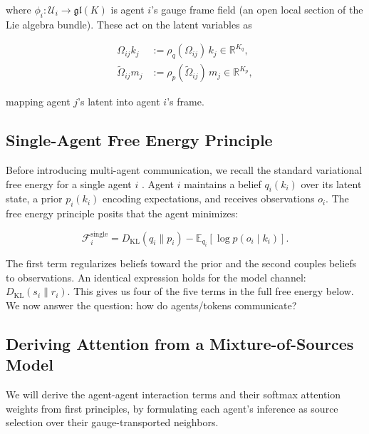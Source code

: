 \documentclass[twoside,11pt]{article}
\begin{document}
where $\phi_i: \mathcal{U}_i \to \mathfrak{gl}(K)$ is agent $i$'s gauge frame field (an open local section of the Lie algebra bundle). These act on the latent variables as

\begin{equation}
\begin{aligned}
\Omega_{ij} k_j
&:= \rho_q(\Omega_{ij}) \, k_j
\in \mathbb{R}^{K_q},\\
\tilde{\Omega}_{ij} m_j
&:= \rho_p(\tilde{\Omega}_{ij}) \, m_j
\in \mathbb{R}^{K_p},
\end{aligned}
\label{eq:gauge_action_on_vectors}
\end{equation}

mapping agent $j$'s latent into agent $i$'s frame. 

\subsection{Single-Agent Free Energy Principle}

Before introducing multi-agent communication, we recall the standard variational free energy for a single agent $i$ \citep{friston2010free,parr2022active}. Agent $i$ maintains a belief $q_i(k_i)$ over its latent state, a prior $p_i(k_i)$ encoding expectations, and receives observations $o_i$. The free energy principle posits that the agent minimizes:

\begin{equation}
\mathcal{F}_i^{\text{single}} = D_{\mathrm{KL}}(q_i \| p_i) - \mathbb{E}_{q_i}[\log p(o_i \mid k_i)].
\label{eq:single_agent_fep}
\end{equation}

The first term regularizes beliefs toward the prior and the second couples beliefs to observations. An identical expression holds for the model channel: $D_{\mathrm{KL}}(s_i \| r_i)$. This gives us four of the five terms in the full free energy below. We now answer the question: how do agents/tokens communicate?

\subsection{Deriving Attention from a Mixture-of-Sources Model}
\label{sec:mixture_derivation}

We will derive the agent-agent interaction terms and their softmax attention weights from first principles, by formulating each agent's inference as source selection over their gauge-transported neighbors.
\end{document}
